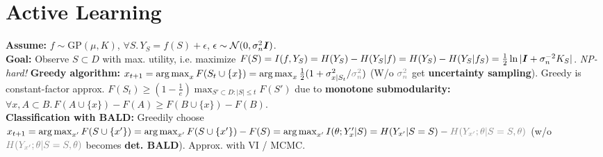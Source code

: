 \section{Active Learning}
\textbf{Assume:} $f\sim\mathrm{GP}(\mu, K)$, $\forall S.\,Y_S = f(S) + \epsilon$, $\epsilon\sim\mathcal{N}(0,\sigma_n^2{\bm{I}})$.\\
\textbf{Goal:} Observe $S\subset D$ with max. utility, i.e. maximize $F(S) = I(f, Y_S) = H(Y_S) - H(Y_S|f) = H(Y_S) - H(Y_S|f_S) = \frac{1}{2}\ln|{\bm{I}}+\sigma_n^{-2}K_S|$. \emph{NP-hard!}
\textbf{Greedy algorithm:} $x_{t+1} = \argmax_x F(S_t\cup \{x\}) = \argmax_x \frac{1}{2}(1+\sigma_{x|S_t}^2/{\color{gray}\sigma_n^2})$ (W/o $\color{gray}\sigma_n^2$ get \textbf{uncertainty sampling}). Greedy is constant-factor approx. $F(S_t) \geq (1-\frac{1}{e})\max_{S'\subset D: |S| \leq t} F(S')$ due to \textbf{monotone submodularity:} $\forall x, A\subset B.\,F(A\cup\{x\}) - F(A) \geq F(B\cup\{x\}) - F(B)$.\\
\textbf{Classification with BALD:} Greedily choose $x_{t+1} = \argmax_{x'}F(S\cup\{x'\}) = \argmax_{x'}F(S\cup\{x'\})-F(S) = 
\argmax_{x'}I(\theta;Y_x'|S) = H(Y_{x'}|S=S) - {\color{gray}H(Y_{x'};\theta|S=S,\theta)}$ (w/o ${\color{gray}H(Y_{x'};\theta|S=S,\theta)}$ becomes \textbf{det. BALD}). Approx. with VI / MCMC.
